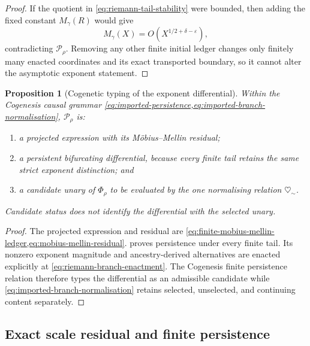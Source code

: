 \documentclass[11pt,a4paper]{article}
\newtheorem{proposition}[theorem]{Proposition}
\theoremstyle{definition}
\newcommand{\Field}{\Phi}
\newcommand{\heartsim}{\heartsuit_{\sim}}
\begin{document}
\begin{proof}
If the quotient in \cref{eq:riemann-tail-stability} were bounded, then adding
the fixed constant $M_\gamma(R)$ would give
\[
  M_\gamma(X)=O\!\left(X^{1/2+\delta-\varepsilon}\right),
\]
contradicting $\mathcal P_\rho$. Removing any other finite initial ledger
changes only finitely many enacted coordinates and its exact transported
boundary, so it cannot alter the asymptotic exponent statement.
\end{proof}

\begin{proposition}[Cogenetic typing of the exponent differential]
\label{prop:riemann-differential-typing}
Within the Cogenesis causal grammar
\cref{eq:imported-persistence,eq:imported-branch-normalisation},
$\mathcal P_\rho$ is:
\begin{enumerate}[label=(\roman*)]
  \item a projected expression with its Möbius--Mellin residual;
  \item a persistent bifurcating differential, because every finite tail
        retains the same strict exponent distinction; and
  \item a candidate unary of $\Field_\rho$ to be evaluated by the one
        normalising relation $\heartsim$.
\end{enumerate}
Candidate status does not identify the differential with the selected unary.
\end{proposition}

\begin{proof}
The projected expression and residual are
\cref{eq:finite-mobius-mellin-ledger,eq:mobius-mellin-residual}.
 proves persistence under every finite tail.
Its nonzero exponent magnitude and ancestry-derived alternatives are enacted
explicitly at \cref{eq:riemann-branch-enactment}. The Cogenesis finite
persistence relation therefore types the differential as an admissible candidate while
\cref{eq:imported-branch-normalisation} retains selected, unselected, and
continuing content separately.
\end{proof}

\subsection{Exact scale residual and finite persistence}
\end{document}
